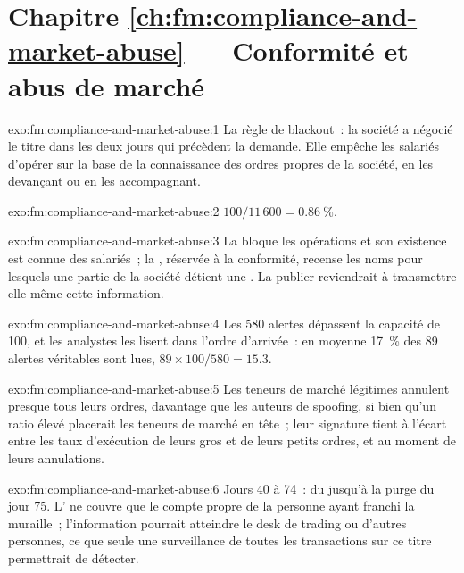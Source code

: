 \section*{Chapitre \ref{ch:fm:compliance-and-market-abuse} --- Conformité et abus de marché}

\begin{solution}{exo:fm:compliance-and-market-abuse:1}
La règle de blackout~: la société a négocié le titre dans les deux jours qui précèdent la demande. Elle empêche les salariés d'opérer sur la base de la connaissance des ordres propres de la société,
en les devançant ou en les accompagnant.
\end{solution}

\begin{solution}{exo:fm:compliance-and-market-abuse:2}
$100/11\,600=0.86~\%$.
\end{solution}

\begin{solution}{exo:fm:compliance-and-market-abuse:3}
La  bloque les opérations et son existence est connue des salariés~; la , réservée à la conformité, recense les noms pour lesquels une partie de la société détient
une . La publier reviendrait à transmettre elle-même cette information.
\end{solution}

\begin{solution}{exo:fm:compliance-and-market-abuse:4}
Les 580 alertes dépassent la capacité de 100, et les analystes les lisent dans l'ordre d'arrivée~: en moyenne 17~\% des 89 alertes véritables sont lues,
$89\times100/580=15.3$.
\end{solution}

\begin{solution}{exo:fm:compliance-and-market-abuse:5}
Les teneurs de marché légitimes annulent presque tous leurs ordres, davantage que les auteurs de spoofing, si bien qu'un ratio élevé placerait les teneurs de marché en tête~; leur signature
tient à l'écart entre les taux d'exécution de leurs gros et de leurs petits ordres, et au moment de leurs annulations.
\end{solution}

\begin{solution}{exo:fm:compliance-and-market-abuse:6}
Jours 40 à 74~: du  jusqu'à la purge du jour 75. L' ne couvre que le compte propre de la personne ayant franchi la muraille~; l'information pourrait
atteindre le desk de trading ou d'autres personnes, ce que seule une surveillance de toutes les transactions sur ce titre permettrait de détecter.
\end{solution}

